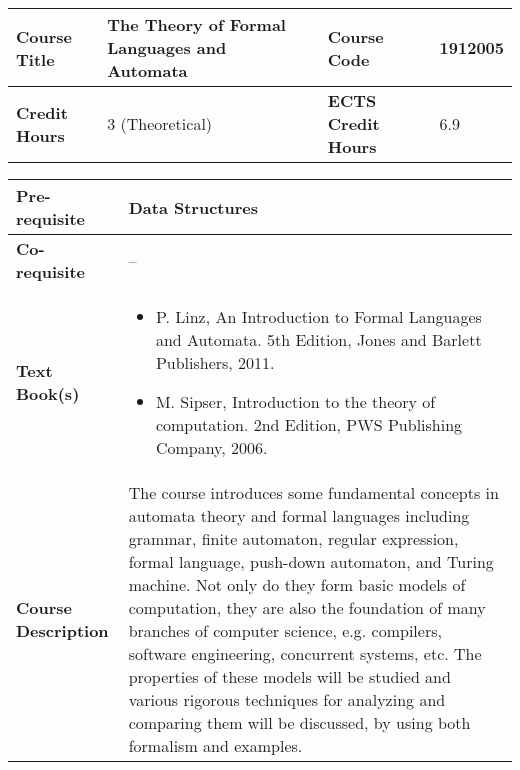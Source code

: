 \documentclass[12pt]{article}
\begin{document}
\bigskip
\bigskip



\begin{minipage}{\textwidth}
\begin{tabularx}{\textwidth}{|l|X|l|X|}
\hline
\textbf{Course Title}       &  The Theory of Formal Languages and Automata & \textbf{Course Code}       &  1912005 \\ \hline
\textbf{Credit Hours}       & 3  (Theoretical) & \textbf{ECTS Credit Hours}       &  6.9 \\ \hline
\end{tabularx}

\begin{tabularx}{\textwidth}{|l|X|}
\hline
\textbf{Pre-requisite}      &  Data Structures\\ \hline
\textbf{Co-requisite}       &  -- \\ \hline
\textbf{Text Book(s)}      & \begin{minipage}{.70\textwidth}
					\begin{itemize} \itemsep-0.4em
						\vspace{3mm}
						\item P. Linz, An Introduction to Formal Languages and Automata. 5th Edition, Jones and Barlett Publishers, 2011.
						\item M. Sipser, Introduction to the theory of computation. 2nd Edition, PWS Publishing Company, 2006.
						\vspace{3mm}
					\end{itemize}
				\end{minipage}  \\ \hline
\textbf{Course Description} & \begin{minipage}{.70\textwidth}
					\vspace{3mm}
					The course introduces some fundamental concepts in automata theory and formal
					languages including grammar, finite automaton, regular expression, formal language, push-down automaton,
					and Turing machine. Not only do they form basic models of computation, they are also the foundation of
					many branches of computer science, e.g. compilers, software engineering, concurrent systems, etc. The
					properties of these models will be studied and various rigorous techniques for analyzing and comparing
					them will be discussed, by using both formalism and examples.

					\vspace{3mm}
					\end{minipage} \\ \hline
\end{tabularx}
\end{minipage}
\end{document}
